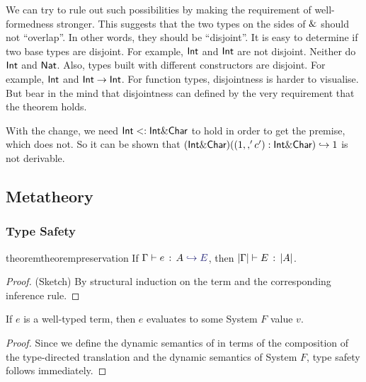 We can try to rule out such possibilities by making the requirement of
well-formedness stronger. This suggests that the two types on the sides of
$\&$ should not ``overlap''. In other words, they should be ``disjoint''. It
is easy to determine if two base types are disjoint. For example, $\textsf{Int}$
and $\textsf{Int}$ are not disjoint. Neither do $\textsf{Int}$ and $\textsf{Nat}$.
Also, types built with different constructors are disjoint. For example,
$\textsf{Int}$ and $\textsf{Int} \to \textsf{Int}$. For function types, disjointness
is harder to visualise. But bear in the mind that disjointness can defined by
the very requirement that the theorem holds.

With the change, we need $\textsf{Int} <: \textsf{Int} \& \textsf{Char}$ to
hold in order to get the premise, which does not. So it can be shown that
$(\textsf{Int} \& \textsf{Char}) ((1 ,, 'c') : \textsf{Int} \&
\textsf{Char}) \hookrightarrow 1$ is not derivable.

\subsection{Metatheory}

\subsubsection{Type Safety}


\begin{restatable}{theorem}{theorempreservation}
  \label{theorem:preservation}
  If $ \hastype \Gamma e A \yields E $,
  then $ \lvert \Gamma \rvert \vdash E \ \!:\! \ \lvert A \rvert $.
\end{restatable}
\begin{proof}
(Sketch) By structural induction on the term and the corresponding
inference rule.
\end{proof}

\begin{theorem}
  If $e$ is a well-typed \name term, then $e$ evaluates to some System $F$
  value $v$.
\end{theorem}
\begin{proof}
  Since we define the dynamic semantics of \name in terms of the composition of
  the type-directed translation and the dynamic semantics of System $F$, type safety follows immediately.
\end{proof}

